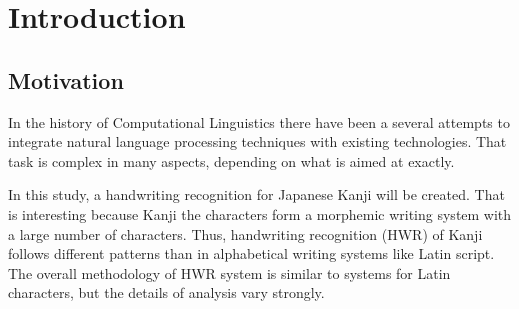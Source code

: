 
\chapter{Introduction}
\label{chap:introduction}
\pagestyle{headings} %

\section{Motivation}
\label{sec:intro:motivation}





In the history of Computational Linguistics there have been a several 
attempts to integrate natural language processing techniques with 
existing technologies. That task is complex in many aspects, depending on what is
aimed at exactly.

In this study, a handwriting recognition for Japanese Kanji will be created. 
That is interesting because Kanji the characters form a morphemic 
writing system with a large number of characters. Thus, handwriting 
recognition (HWR) of Kanji follows different patterns than in alphabetical 
writing systems like Latin script. The overall methodology of HWR system is 
similar to systems for Latin characters, but the details of analysis vary 
strongly.

